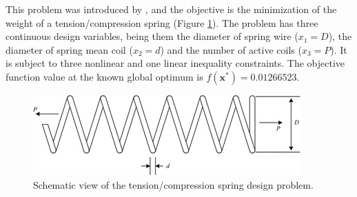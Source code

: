


This problem was introduced by \cite{TC}, and the objective is the minimization of the weight of a tension/compression spring (Figure \ref{fig:TC}). The problem has three continuous design variables, being them the diameter of spring wire ($x_1 = D$), the diameter of spring mean coil ($x_2 = d$) and the number of active coils ($x_3 = P$). It is subject to three nonlinear and one linear inequality constraints. The objective function value at the known global optimum is $f(\bm{x}^*) = 0.01266523$. %


%

\vspace{0.5cm}


\begin{figure}[h]
\begin{center}
\includegraphics[scale=0.5]{img/Problems/TC.png}
\end{center}
\captionsetup{justification=centering}
\caption{Schematic view of the tension/compression spring design problem.}\label{fig:TC}
\end{figure}

